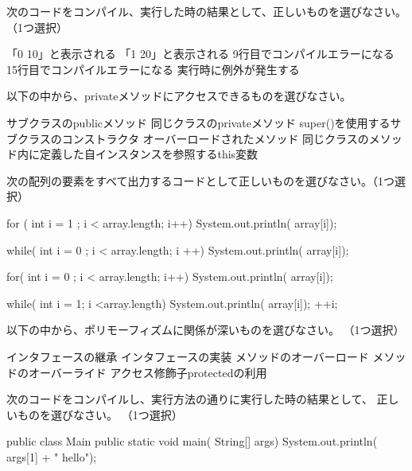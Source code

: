 \documentclass[12pt]{article}
\begin{document}

次のコードをコンパイル、実行した時の結果として、正しいものを選びなさい。（1つ選択）


「0 10」と表示される
「1 20」と表示される
9行目でコンパイルエラーになる
15行目でコンパイルエラーになる
実行時に例外が発生する


以下の中から、privateメソッドにアクセスできるものを選びなさい。

サブクラスのpublicメソッド
同じクラスのprivateメソッド
super()を使用するサブクラスのコンストラクタ
オーバーロードされたメソッド
同じクラスのメソッド内に定義した自インスタンスを参照するthis変数


次の配列の要素をすべて出力するコードとして正しいものを選びなさい。（1つ選択）


for ( int i = 1 ; i < array.length; i++){
    System.out.println( array[i]);
}

while( int i = 0 ; i < array.length; i ++){
    System.out.println( array[i]);
}

for( int i = 0 ; i < array.length; i++){
    System.out.println( array[i]);
}

while( int i = 1; i <array.length){
    System.out.println( array[i]);
    ++i;
}

以下の中から、ポリモーフィズムに関係が深いものを選びなさい。
（1つ選択）

インタフェースの継承
インタフェースの実装
メソッドのオーバーロード
メソッドのオーバーライド
アクセス修飾子protectedの利用

次のコードをコンパイルし、実行方法の通りに実行した時の結果として、
正しいものを選びなさい。
（1つ選択）

public  class Main{
    public static void main( String[] args){
        System.out.println( args[1] + " hello");
    }
}
\end{document}
